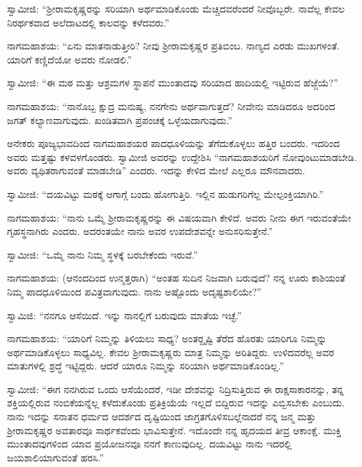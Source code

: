  ಸ್ವಾಮೀಜಿ: “ಶ‍್ರೀರಾಮಕೃಷ್ಣರನ್ನು ಸರಿಯಾಗಿ ಅರ್ಥಮಾಡಿಕೊಂಡು ಮೆಚ್ಚಿದವರೆಂದರೆ ನೀವೊಬ್ಬರೇ. ನಾವೆಲ್ಲ ಕೇವಲ ನಿರರ್ಥಕವಾದ ಅಲೆದಾಟದಲ್ಲಿ ಕಾಲವನ್ನು ಕಳೆದವರು.” 

 ನಾಗಮಹಾಶಯ: “ಏನು ಮಾತನಾಡುತ್ತೀರಿ? ನೀವು ಶ‍್ರೀರಾಮಕೃಷ್ಣರ ಪ್ರತಿಬಿಂಬ. ನಾಣ್ಯದ ಎರಡು ಮುಖಗಳಂತೆ. ಯಾರಿಗೆ ಕಣ್ಣಿದೆಯೋ ಅವರು ನೋಡಲಿ.” 

 ಸ್ವಾಮೀಜಿ: “ಈ ಮಠ ಮತ್ತು ಆಶ್ರಮಗಳ ಸ್ಥಾಪನೆ ಮುಂತಾದವು ಸರಿಯಾದ ಹಾದಿಯಲ್ಲಿ ಇಟ್ಟಿರುವ ಹೆಜ್ಜೆಯೆ?” 

 ನಾಗಮಹಾಶಯ: “ನಾನೊಬ್ಬ ಕ್ಷುದ್ರ ಮನುಷ್ಯ, ನನಗೇನು ಅರ್ಥವಾಗುತ್ತದೆ? ನೀವೇನು ಮಾಡಿದರೂ ಅದರಿಂದ ಜಗತ್ ಕಲ್ಯಾಣವಾಗುವುದು. ಖಂಡಿತವಾಗಿ ಪ್ರಪಂಚಕ್ಕೆ ಒಳ್ಳೆಯದಾಗುವುದು.” 

 ಅನೇಕರು ಪೂಜ್ಯಭಾವದಿಂದ ನಾಗಮಹಾಶಯರ ಪಾದಧೂಳಿಯನ್ನು ತೆಗೆದುಕೊಳ್ಳಲು ಹತ್ತಿರ ಬಂದರು. ಇದರಿಂದ ಅವರು ಮತ್ತಷ್ಟು ಕಳವಳಗೊಂಡರು. ಸ್ವಾಮೀಜಿ ಅವರನ್ನು ಉದ್ದೇಶಿಸಿ “ನಾಗಮಹಾಶಯರಿಗೆ ನೋವುಂಟುಮಾಡಬೇಡಿ. ಅವರು ವ್ಯಥಿತರಾಗುವಂತೆ ಮಾಡಬೇಡಿ” ಎಂದರು. ಇದನ್ನು ಕೇಳಿದ ಮೇಲೆ ಎಲ್ಲರೂ ಮೌನವಾದರು. 

 ಸ್ವಾಮೀಜಿ: “ದಯವಿಟ್ಟು ಮಠಕ್ಕೆ ಆಗಾಗ್ಗೆ ಬಂದು ಹೋಗುತ್ತಿರಿ. ಇಲ್ಲಿನ ಹುಡುಗರಿಗೆಲ್ಲ ಮೇಲ್ಪಂಕ್ತಿಯಾಗಿರಿ.” 

 ನಾಗಮಹಾಶಯ: “ನಾನು ಒಮ್ಮೆ ಶ‍್ರೀರಾಮಕೃಷ್ಣರನ್ನು ಈ ವಿಷಯವಾಗಿ ಕೇಳಿದೆ. ಅವರು ನೀನು ಈಗ ಇರುವಂತೆಯೇ ಗೃಹಸ್ಥನಾಗಿರು ಎಂದರು. ಅದರಂತಯೇ ನಾನು ಅವರ ಉಪದೇಶವನ್ನೇ ಅನುಸರಿಸುತ್ತೇನೆ.” 

 ಸ್ವಾಮೀಜಿ: “ಒಮ್ಮೆ ನಾನು ನಿಮ್ಮ ಸ್ಥಳಕ್ಕೆ ಬರಬೇಕೆಂದು ಇರುವೆ.” 

\vskip 1pt

 ನಾಗಮಹಾಶಯ: (ಆನಂದದಿಂದ ಉನ್ಮತ್ತರಾಗಿ) “ಅಂತಹ ಸುದಿನ ನಿಜವಾಗಿ ಬರುವುದೆ? ನನ್ನ ಊರು ಕಾಶಿಯಂತೆ ನಿಮ್ಮ ಪಾದಧೂಳಿಯಿಂದ ಪವಿತ್ರವಾಗುವುದು. ನಾನು ಅಷ್ಟೊಂದು ಅದೃಷ್ಟಶಾಲಿಯೇ?” 

\vskip 1pt

 ಸ್ವಾಮಿಜಿ: “ನನಗೂ ಆಸೆಯಿದೆ. ಇನ್ನು ನಾನಲ್ಲಿಗೆ ಬರುವುದು ಮಾತೆಯ ಇಚ್ಛೆ.” 

\vskip 1pt

 ನಾಗಮಹಾಶಯ: “ಯಾರಿಗೆ ನಿಮ್ಮನ್ನು ತಿಳಿಯಲು ಸಾಧ್ಯ? ಅಂತರ್‍ದೃಷ್ಟಿ ತೆರೆದ ಹೊರತು ಯಾರಿಗೂ ನಿಮ್ಮನ್ನು ಅರ್ಥಮಾಡಿಕೊಳ್ಳಲು ಸಾಧ್ಯವಿಲ್ಲ. ಕೇವಲ ಶ‍್ರೀರಾಮಕೃಷ್ಣರು ಮಾತ್ರ ನಿಮ್ಮನ್ನು ಅರಿತಿದ್ದರು. ಉಳಿದವರೆಲ್ಲ ಅವರ ಮಾತುಗಳಲ್ಲಿ ಶ್ರದ್ಧೆ ಇಟ್ಟಿದ್ದರು. ಆದರೆ ಯಾರೂ ನಿಮ್ಮನ್ನು ಸರಿಯಾಗಿ ಅರ್ಥಮಾಡಿಕೊಂಡಿಲ್ಲ.” 

\vskip 1pt

 ಸ್ವಾಮೀಜಿ: “ಈಗ ನನಗಿರುವ ಒಂದು ಆಸೆಯೆಂದರೆ, ಇಡೀ ದೇಶವನ್ನು ನಿದ್ರಿಸುತ್ತಿರುವ ಈ ರಾಕ್ಷಸಾಕಾರನನ್ನು, ತನ್ನ ಶಕ್ತಿಯಲ್ಲಿರುವ ನಂಬಿಕೆಯನ್ನೆಲ್ಲ ಕಳೆದುಕೊಂಡು ಪ್ರತಿಕ್ರಿಯೆಯೆ ಇಲ್ಲದೆ ಬಿದ್ದಿರುವ ಇದನ್ನು ಎಬ್ಬಿಸಬೇಕು ಎಂಬುದು. ನಾನು ಇದನ್ನು ಸನಾತನ ಧರ್ಮದ ಆದರ್ಶದ ದೃಷ್ಟಿಯಿಂದ ಜಾಗ್ರತಗೊಳಿಸಬಲ್ಲೆನಾದರೆ ನನ್ನ ಜನ್ಮ ಮತ್ತು ಶ‍್ರೀರಾಮಕೃಷ್ಣರ ಅವತಾರವೂ ಸಾರ್ಥಕವೆಂದು ಭಾವಿಸುತ್ತೇನೆ. ಇದೊಂದೇ ನನ್ನ ಹೃದಯದ ತೀವ್ರ ಆಕಾಂಕ್ಷೆ. ಮುಕ್ತಿ ಮುಂತಾದವುಗಳಿಂದ ಯಾವ ಪ್ರಯೋಜನವೂ ನನಗೆ ಕಾಣುವುದಿಲ್ಲ. ದಯವಿಟ್ಟು ನಾನು ಇದರಲ್ಲಿ ಜಯಶಾಲಿಯಾಗುವಂತೆ ಹರಸಿ.” 

